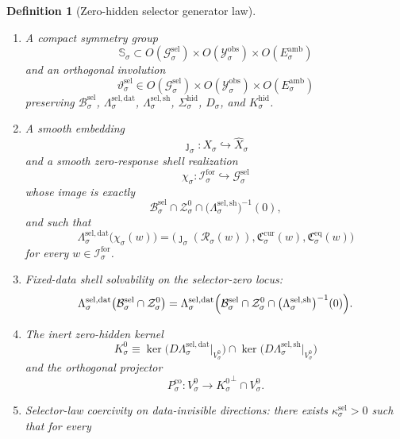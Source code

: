 \documentclass[11pt]{article}
\newcommand{\ForSpace}[1]{\mathcal I_{#1}^{\mathrm{for}}}
\newcommand{\Reduction}[1]{\mathcal R_{#1}}
\newcommand{\CurrentCarrier}[1]{\mathfrak C_{#1}^{\mathrm{cur}}}
\newcommand{\EqCarrier}[1]{\mathfrak C_{#1}^{\mathrm{eq}}}
\newcommand{\VisibleAffine}[1]{\widehat X_{#1}}
\newcommand{\DataSpace}[1]{\mathcal Y_{#1}^{\mathrm{obs}}}
\newcommand{\AmbientTarget}[1]{E_{#1}^{\mathrm{amb}}}
\newcommand{\GapSpace}[1]{H_{#1}}
\newcommand{\GapBody}[1]{D_{#1}}
\newcommand{\HiddenOperator}[1]{K_{#1}^{\mathrm{hid}}}
\newcommand{\GenSpace}[1]{\mathcal G_{#1}^{\mathrm{sel}}}
\newcommand{\GenBody}[1]{\mathcal B_{#1}^{\mathrm{sel}}}
\newcommand{\GenData}[1]{\Lambda_{#1}^{\mathrm{sel,dat}}}
\newcommand{\GenShell}[1]{\Lambda_{#1}^{\mathrm{sel,sh}}}
\newcommand{\HiddenSel}[1]{\Sigma_{#1}^{\mathrm{hid}}}
\newcommand{\ZeroHiddenSlice}[1]{\mathcal Z_{#1}^{0}}
\newcommand{\ZeroHiddenVec}[1]{V_{#1}^{0}}
\newcommand{\GenSym}[1]{\mathbb S_{#1}}
\newcommand{\GenTime}[1]{\vartheta_{#1}^{\mathrm{sel}}}
\newcommand{\GenEmbed}[1]{\chi_{#1}}
\newcommand{\Kernel}[1]{K_{#1}^{0}}
\newcommand{\StateComp}[1]{P_{#1}^{\mathrm{co}}}
\newtheorem{definition}{Definition}
\begin{document}
\begin{definition}[Zero-hidden selector generator law]
\begin{enumerate}
\begin{equation}
    \kappa_{\sigma}^{\mathrm{hid}}\,
    \|\eta\|^{2}
    \qquad
    \text{for all }\eta\in\GapSpace{\sigma}
    \label{eq:gengap}
    \end{equation}
    for some \(\kappa_{\sigma}^{\mathrm{hid}}>0\).
    \item A compact symmetry group
    \[
    \GenSym{\sigma}\subset
    O(\GenSpace{\sigma})\times
    O(\DataSpace{\sigma})\times
    O(\AmbientTarget{\sigma})
    \]
    and an orthogonal involution
    \[
    \GenTime{\sigma}\in
    O(\GenSpace{\sigma})\times
    O(\DataSpace{\sigma})\times
    O(\AmbientTarget{\sigma})
    \]
    preserving \(\GenBody{\sigma}\), \(\GenData{\sigma}\), \(\GenShell{\sigma}\), \(\HiddenSel{\sigma}\), \(\GapBody{\sigma}\), and \(\HiddenOperator{\sigma}\).
    \item A smooth embedding
    \[
    \jmath_{\sigma}:X_{\sigma}\hookrightarrow\VisibleAffine{\sigma}
    \]
    and a smooth zero-response shell realization
    \[
    \GenEmbed{\sigma}:\ForSpace{\sigma}\hookrightarrow\GenSpace{\sigma}
    \]
    whose image is exactly
    \[
    \GenBody{\sigma}\cap
    \ZeroHiddenSlice{\sigma}\cap
    \bigl(\GenShell{\sigma}\bigr)^{-1}(0),
    \]
    and such that
    \begin{equation}
    \GenData{\sigma}\bigl(\GenEmbed{\sigma}(w)\bigr)
    =
    \bigl(
    \jmath_{\sigma}(\Reduction{\sigma}(w)),
    \CurrentCarrier{\sigma}(w),
    \EqCarrier{\sigma}(w)
    \bigr)
    \label{eq:gencompat}
    \end{equation}
    for every \(w\in\ForSpace{\sigma}\).
    \item Fixed-data shell solvability on the selector-zero locus:
    \begin{equation}
    \GenData{\sigma}\bigl(
    \GenBody{\sigma}\cap\ZeroHiddenSlice{\sigma}
    \bigr)
    =
    \GenData{\sigma}\Bigl(
    \GenBody{\sigma}\cap
    \ZeroHiddenSlice{\sigma}\cap
    \bigl(\GenShell{\sigma}\bigr)^{-1}(0)
    \Bigr).
    \label{eq:gensolvability}
    \end{equation}
    \item The inert zero-hidden kernel
    \[
    \Kernel{\sigma}
    \equiv
    \ker\bigl(D\GenData{\sigma}\big|_{\ZeroHiddenVec{\sigma}}\bigr)
    \cap
    \ker\bigl(D\GenShell{\sigma}\big|_{\ZeroHiddenVec{\sigma}}\bigr)
    \]
    and the orthogonal projector
    \[
    \StateComp{\sigma}:
    \ZeroHiddenVec{\sigma}\to
    {\Kernel{\sigma}}^{\perp}\cap\ZeroHiddenVec{\sigma}.
    \]
    \item Selector-law coercivity on data-invisible directions: there exists \(\kappa_{\sigma}^{\mathrm{sel}}>0\) such that for every

\end{enumerate}
\end{definition}
\end{document}

